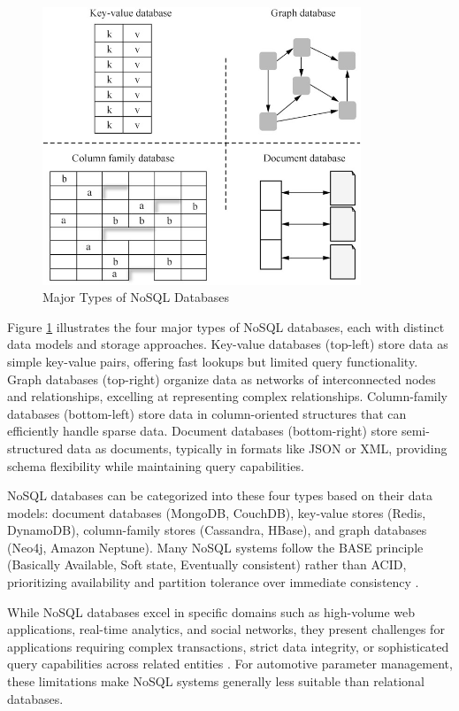 \begin{figure}[ht]
    \centering
    \includegraphics[width=0.85\textwidth]{figures/nosql_types.png}
    \caption{Major Types of NoSQL Databases \cite{gaussdbdatabase}}
    \label{fig:nosql-types}
\end{figure}

Figure \ref{fig:nosql-types} illustrates the four major types of NoSQL databases, each with distinct data models and storage approaches. Key-value databases (top-left) store data as simple key-value pairs, offering fast lookups but limited query functionality. Graph databases (top-right) organize data as networks of interconnected nodes and relationships, excelling at representing complex relationships. Column-family databases (bottom-left) store data in column-oriented structures that can efficiently handle sparse data. Document databases (bottom-right) store semi-structured data as documents, typically in formats like JSON or XML, providing schema flexibility while maintaining query capabilities.

NoSQL databases can be categorized into these four types based on their data models: document databases (MongoDB, CouchDB), key-value stores (Redis, DynamoDB), column-family stores (Cassandra, HBase), and graph databases (Neo4j, Amazon Neptune). Many NoSQL systems follow the BASE principle (Basically Available, Soft state, Eventually consistent) rather than ACID, prioritizing availability and partition tolerance over immediate consistency \cite{brewer2000towards}.

While NoSQL databases excel in specific domains such as high-volume web applications, real-time analytics, and social networks, they present challenges for applications requiring complex transactions, strict data integrity, or sophisticated query capabilities across related entities \cite{kleppmann2017conflict}. For automotive parameter management, these limitations make NoSQL systems generally less suitable than relational databases.


